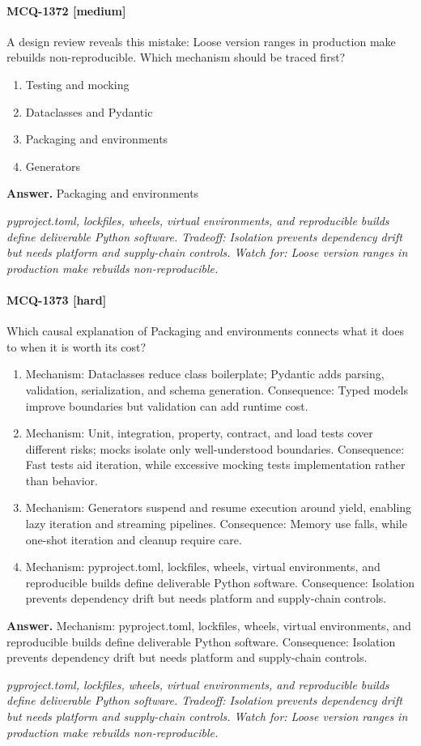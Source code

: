 \paragraph{MCQ-1372 [medium]} A design review reveals this mistake: Loose version ranges in production make rebuilds non-reproducible. Which mechanism should be traced first?
\begin{enumerate}[label=\Alph*.]
\item Testing and mocking
\item Dataclasses and Pydantic
\item Packaging and environments
\item Generators
\end{enumerate}
\noindent\textbf{Answer.} Packaging and environments
\par\textit{pyproject.toml, lockfiles, wheels, virtual environments, and reproducible builds define deliverable Python software. Tradeoff: Isolation prevents dependency drift but needs platform and supply-chain controls. Watch for: Loose version ranges in production make rebuilds non-reproducible.}
\paragraph{MCQ-1373 [hard]} Which causal explanation of Packaging and environments connects what it does to when it is worth its cost?
\begin{enumerate}[label=\Alph*.]
\item Mechanism: Dataclasses reduce class boilerplate; Pydantic adds parsing, validation, serialization, and schema generation. Consequence: Typed models improve boundaries but validation can add runtime cost.
\item Mechanism: Unit, integration, property, contract, and load tests cover different risks; mocks isolate only well-understood boundaries. Consequence: Fast tests aid iteration, while excessive mocking tests implementation rather than behavior.
\item Mechanism: Generators suspend and resume execution around yield, enabling lazy iteration and streaming pipelines. Consequence: Memory use falls, while one-shot iteration and cleanup require care.
\item Mechanism: pyproject.toml, lockfiles, wheels, virtual environments, and reproducible builds define deliverable Python software. Consequence: Isolation prevents dependency drift but needs platform and supply-chain controls.
\end{enumerate}
\noindent\textbf{Answer.} Mechanism: pyproject.toml, lockfiles, wheels, virtual environments, and reproducible builds define deliverable Python software. Consequence: Isolation prevents dependency drift but needs platform and supply-chain controls.
\par\textit{pyproject.toml, lockfiles, wheels, virtual environments, and reproducible builds define deliverable Python software. Tradeoff: Isolation prevents dependency drift but needs platform and supply-chain controls. Watch for: Loose version ranges in production make rebuilds non-reproducible.}

